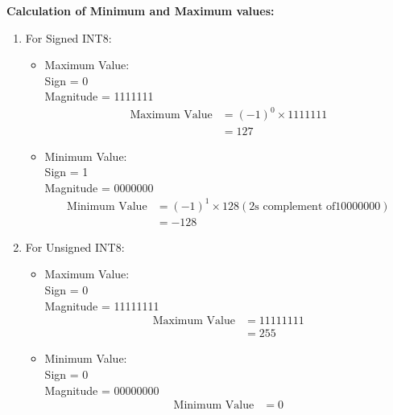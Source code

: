 \documentclass{ioereport}
\begin{document}
\begin{enumerate}[label=\textbf{\roman*.}]
    \textbf{Calculation of Minimum and Maximum values:} 
    \begin{enumerate}
        \item For Signed INT8:
        \begin{itemize}
            \item Maximum Value:\\
            Sign = 0 \\
            Magnitude = 1111111
                \[
                \begin{aligned}
                    \text{Maximum Value} &= (-1)^{0} \times 1111111 \\
                    &= 127
                \end{aligned}
                \]
            \item Minimum Value:\\
            Sign = 1 \\
            Magnitude = 0000000 
                \[
                \begin{aligned}
                    \text{Minimum Value} &= (-1)^{1} \times 128 (\text{2s complement of} 10000000)\\
                    &= -128
                \end{aligned}
                \]
            \end{itemize}
    \item For Unsigned INT8: 
            \begin{itemize}
                \item Maximum Value:\\
            Sign = 0 \\
            Magnitude = 11111111
                \[
                \begin{aligned}
                    \text{Maximum Value} &= 11111111 \\
                    &=255
                \end{aligned}
                \]
            \item Minimum Value:\\
            Sign = 0 \\
            Magnitude = 00000000 
                \[
                \begin{aligned}
                    \text{Minimum Value} &= 0
                \end{aligned}
            \]
            \end{itemize}
    \end{enumerate}


\end{enumerate}
\end{document}
